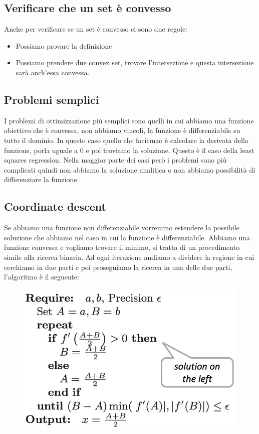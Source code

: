 \documentclass[14pt]{extreport}
\begin{document}
\subsection{Verificare che un set è convesso}

Anche per verificare se un set è convesso ci sono due regole:

\begin{itemize}
\item Possiamo provare la definizione
\item Possiamo prendere due convex set, trovare l'intersezione e questa intersezione sarà anch'essa convessa.
\end{itemize}


\subsection{Problemi semplici}

I problemi di ottimizzazione più semplici sono quelli in cui abbiamo una funzione obiettivo che è convessa, non abbiamo vincoli, la funzione è
differenziabile su tutto il dominio. In questo caso quello che facicmao è calcolare la derivata della funzione, porla uguale a 0 e poi troviamo la
soluzione. Questo è il caso della least squares regression. Nella maggior parte dei casi però i problemi sono più complicati quindi non abbiamo la
soluzione analitica o non abbiamo possibilità di differenziare la funzione.

\subsection{Coordinate descent}

Se abbiamo una funzione non differenziabile vorremmo estendere la possibile soluzione che abbiamo nel caso in cui la funzione è differenziabile.
Abbiamo una funzione convessa e vogliamo trovare il minimo, si tratta di un procedimento simile alla ricerca binaria. Ad ogni iterazione andiamo a
dividere la regione in cui cerchiamo in due parti e poi proseguiamo la ricerca in una delle due parti, l'algoritmo è il seguente:

\begin{figure}[H]
\centering
\includegraphics[width=0.7\linewidth]{236.jpeg}
\end{figure}
\end{document}
